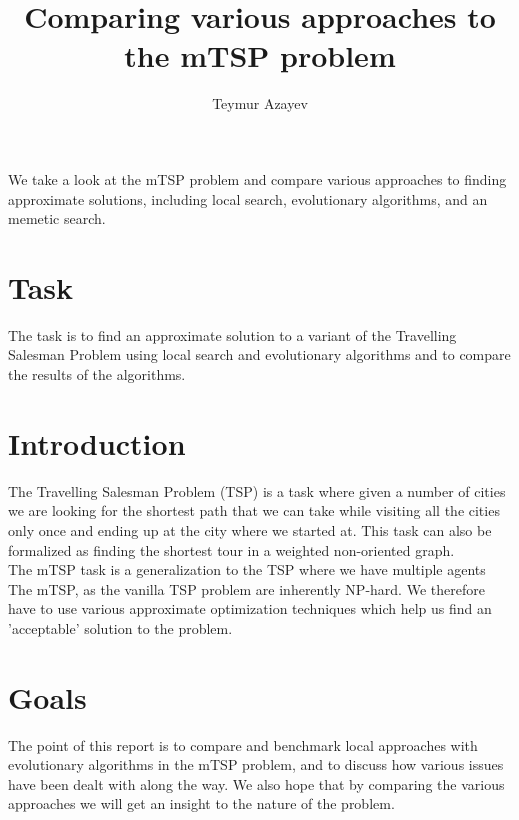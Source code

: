 \documentclass[journal]{IEEEtrancz}
\begin{document}
\title{Comparing various approaches to the mTSP problem}
\author{Teymur Azayev}

\maketitle

\begin{abstrakt}
We take a look at the mTSP problem and compare various approaches to finding approximate solutions, including local search, evolutionary algorithms, and an memetic search.
\end{abstrakt}


\IEEEpeerreviewmaketitle

\section{Task}
The task is to find an approximate solution to a variant of the Travelling Salesman Problem using local search and evolutionary algorithms and to compare the results of the algorithms.

\section{Introduction}
The Travelling Salesman Problem (TSP) is a task where given a number of cities we are looking for the shortest path that we can take while visiting all the cities only once and ending up at the city where we started at. 
This task can also be formalized as finding the shortest tour in a weighted non-oriented graph. \\
The mTSP task is a generalization to the TSP where we have multiple agents
The mTSP, as the vanilla TSP problem are inherently NP-hard. We therefore have to use various approximate
optimization techniques which help us find an 'acceptable' solution to the problem.

\section{Goals}
The point of this report is to compare and benchmark local approaches with evolutionary algorithms in the mTSP
problem, and to discuss how various issues have been dealt with along the way. We also hope that by comparing the various approaches we will get an insight to the nature of the problem.
\end{document}
